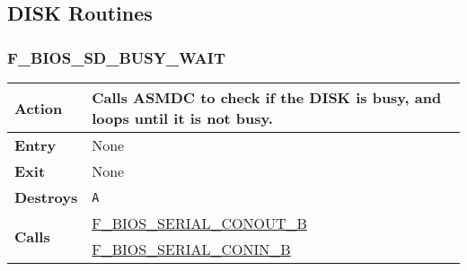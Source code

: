\documentclass[a4paper,11pt]{article}
\begin{document}
    \subsection{DISK Routines}

        \subsubsection{F\_BIOS\_SD\_BUSY\_WAIT}
        \label{func:fbiossdbusywait}
        \begin{tabular}{l p{9cm}}
            \hline\textbf{Action}
            & Calls \textbf{ASMDC} to check if the \textbf{DISK} is busy, and
            loops until it is not busy. \\
            \hline\textbf{Entry} & None \\
            \hline\textbf{Exit} & None \\
            \hline\textbf{Destroys} & \texttt{A} \\
            \hline\multirow[t]{2}{4em}{\textbf{Calls}}
            & \hyperref[func:fbiosserialconoutb]{F\_BIOS\_SERIAL\_CONOUT\_B}\\
            & \hyperref[func:fbiosserialconinb]{F\_BIOS\_SERIAL\_CONIN\_B}\\
            \hline
        \end{tabular}

\end{document}
